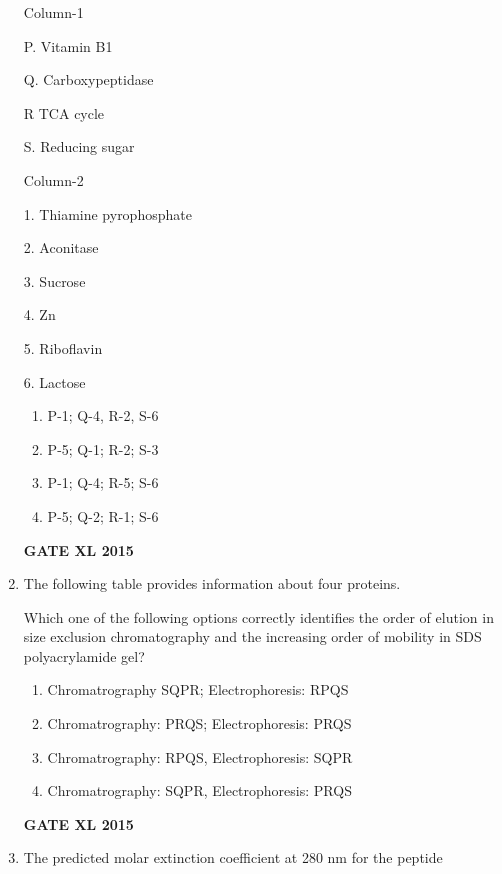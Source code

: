 \documentclass[journal,12pt,onecolumn]{IEEEtran}
\begin{document}
\begin{enumerate}
	\begin{minipage}{0.5\textwidth}
		\begin{flushleft}
Column-1

P. Vitamin B1


Q. Carboxypeptidase


R TCA cycle


S. Reducing sugar

		\end{flushleft}
	\end{minipage}
	\begin{minipage}{0.5\textwidth}
		\begin{flushleft}
Column-2

1. Thiamine pyrophosphate

2. Aconitase

3. Sucrose

4. Zn

5. Riboflavin

6. Lactose

		\end{flushleft}
	\end{minipage}
    \begin{enumerate}
            \item P-1; Q-4, R-2, S-6
	    \item P-5; Q-1; R-2; S-3
	    \item P-1; Q-4; R-5; S-6
            \item P-5; Q-2; R-1; S-6
	\end{enumerate}
\begin{flushright}\textbf{GATE XL 2015}\end{flushright}
\item The following table provides information about four proteins.
\vspace{0.2cm}
\begin{table}[H]

\end{table}
Which one of the following options correctly identifies the order of elution in size exclusion chromatography and the increasing order of mobility in SDS polyacrylamide gel?
    \begin{enumerate}
	    \item Chromatrography SQPR; Electrophoresis: RPQS
	    \item Chromatrography: PRQS; Electrophoresis: PRQS
	    \item Chromatrography: RPQS, Electrophoresis: SQPR
            \item Chromatrography: SQPR, Electrophoresis: PRQS
    \end{enumerate}
\begin{flushright}\textbf{GATE XL 2015}\end{flushright}
\item The predicted molar extinction coefficient at 280 nm for the peptide


\end{enumerate}
\end{document}
